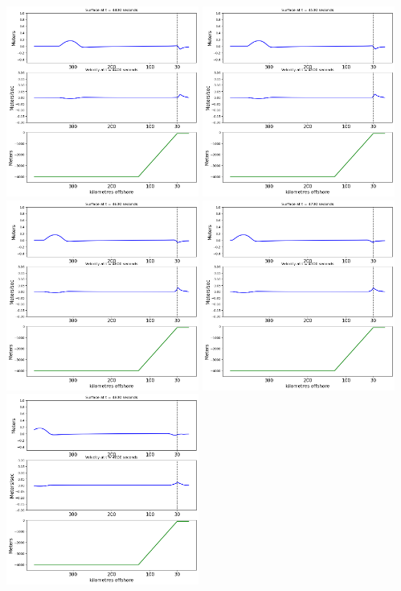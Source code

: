 \documentclass[11pt]{article}
\begin{document}
\vskip 10pt 
\includegraphics[width=0.475\textwidth]{frame0044fig2.png}
\vskip 10pt 
\includegraphics[width=0.475\textwidth]{frame0045fig2.png}
\vskip 10pt 
\includegraphics[width=0.475\textwidth]{frame0046fig2.png}
\vskip 10pt 
\includegraphics[width=0.475\textwidth]{frame0047fig2.png}
\vskip 10pt 
\includegraphics[width=0.475\textwidth]{frame0048fig2.png}
\end{document}
